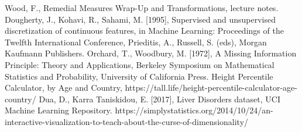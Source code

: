 \begin{thebibliography}{99}
Wood, F., Remedial Measures Wrap-Up and Transformations, lecture notes. 
Dougherty, J., Kohavi, R., Sahami, M. [1995], Supervised and unsupervised discretization of continuous features, in Machine Learning: Proceedings of the Twelfth International Conference, Prieditis, A., Russell, S. (eds), Morgan Kaufmann Publishers. 
Orchard, T., Woodbury, M. [1972], A Missing Information Principle: Theory and Applications, Berkeley Symposium on Mathematical Statistics and Probability, University of California Press.  
Height Percentile Calculator, by Age and Country, https://tall.life/height-percentile-calculator-age-country/ 
 Dua, D., Karra Taniskidou, E. [2017], Liver Disorders dataset, UCI Machine Learning Repository.
 https://simplystatistics.org/2014/10/24/an-interactive-visualization-to-teach-about-the-curse-of-dimensionality/ 
\end{thebibliography}

